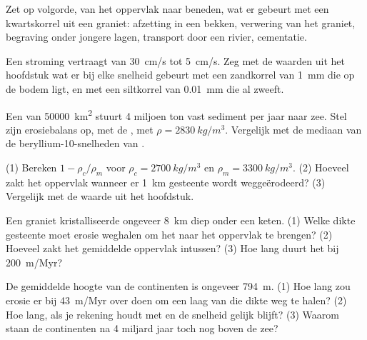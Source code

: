\begin{exercise}[$\star$]\label{exo:g12:destruction-of-mountains:5}
Zet op volgorde, van het oppervlak naar beneden, wat er gebeurt met een kwartskorrel
uit een graniet: afzetting in een bekken, verwering van het graniet, begraving onder
jongere lagen, transport door een rivier, cementatie.
\end{exercise}

\begin{exercise}[$\star\star$]\label{exo:g12:destruction-of-mountains:6}
Een stroming vertraagt van \qty{30}{cm/s} tot \qty{5}{cm/s}. Zeg met de waarden
uit het hoofdstuk wat er bij elke snelheid gebeurt met een zandkorrel van \qty{1}{mm} die op
de bodem ligt, en met een siltkorrel van \qty{0.01}{mm} die al zweeft.
\end{exercise}

\begin{exercise}[$\star\star$]\label{exo:g12:destruction-of-mountains:7}
Een  van \qty{50000}{km^2} stuurt 4 miljoen ton vast sediment per jaar
naar zee. Stel zijn erosiebalans op, met de , met $\rho =
\qty{2830}{kg/m^3}$. Vergelijk met de mediaan van de beryllium-10-snelheden van .
\end{exercise}

\begin{exercise}[$\star\star$]\label{exo:g12:destruction-of-mountains:8}
(1) Bereken $1 - \rho_c/\rho_m$ voor $\rho_c = \qty{2700}{kg/m^3}$ en
$\rho_m = \qty{3300}{kg/m^3}$. (2) Hoeveel zakt het oppervlak wanneer er
\qty{1}{km} gesteente wordt weggeërodeerd? (3) Vergelijk met de waarde uit het hoofdstuk.
\end{exercise}

\begin{exercise}[$\star\star$]\label{exo:g12:destruction-of-mountains:9}
Een graniet kristalliseerde ongeveer \qty{8}{km} diep onder een keten. (1) Welke
dikte gesteente moet erosie weghalen om het naar het oppervlak te brengen? (2) Hoeveel
zakt het gemiddelde oppervlak intussen? (3) Hoe lang duurt het bij \qty{200}{m/Myr}?
\end{exercise}

\begin{exercise}[$\star\star$]\label{exo:g12:destruction-of-mountains:10}
De gemiddelde hoogte van de continenten is ongeveer \qty{794}{m}. (1) Hoe lang zou
erosie er bij \qty{43}{m/Myr} over doen om een laag van die dikte weg te halen?
(2) Hoe lang, als je rekening houdt met  en de snelheid
gelijk blijft? (3) Waarom staan de continenten na 4 miljard jaar toch nog boven de zee?
\end{exercise}

